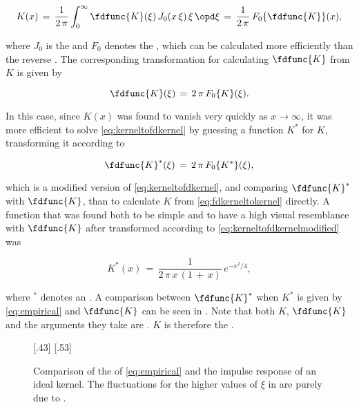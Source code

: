 \begin{equation} \label{eq:fdkerneltokernel}
K(x) \,=\, \frac{1}{2\,\pi}\int_0^\infty\fdfunc{K}(\xi)\,J_0(x\,\xi)\,\xi\,\opd\xi \,=\, \frac{1}{2\,\pi}\,F_0\{\fdfunc{K}\}(x),
\end{equation}

where $J_0$ is the  and $F_0$ denotes the , which can be calculated more efficiently than the reverse . The corresponding transformation for calculating $\fdfunc{K}$ from $K$ is given by

\begin{equation} \label{eq:kerneltofdkernel}
\fdfunc{K}(\xi) \,=\, 2\,\pi\,F_0\{K\}(\xi).
\end{equation}

In this case, since $K(x)$ was found to vanish very quickly as $x\rightarrow\infty$, it was more efficient to solve \eqref{eq:kerneltofdkernel} by guessing a function $K^*$ for $K$, transforming it according to

\begin{equation} \label{eq:kerneltofdkernelmodified}
\fdfunc{K}^*(\xi) \,=\, 2\,\pi\,F_0\{K^*\}(\xi),
\end{equation}

which is a modified version of \eqref{eq:kerneltofdkernel}, and comparing $\fdfunc{K}^*$ with $\fdfunc{K}$, than to calculate $K$ from \eqref{eq:fdkerneltokernel} directly. A function that was found both to be simple and to have a high visual resemblance with $\fdfunc{K}$ after transformed according to \eqref{eq:kerneltofdkernelmodified} was

\begin{equation} \label{eq:empirical}
K^*(x) \,=\, \frac{1}{2\,\pi\,x\,(1\,+\,x)}\,e^{-x^2/4},
\end{equation}

where $^*$ denotes an \estimate. A comparison between $\fdfunc{K}^*$ when $K^*$ is given by \eqref{eq:empirical} and $\fdfunc{K}$ can be seen in . Note that both $K$, $\fdfunc{K}$ and the arguments they take are . $K$ is therefore the .

\begin{figure}
    \centering
    \subcaptionbox{\label{fig:transformedkernelcomparison}}[.43\textwidth]{}
    \subcaptionbox{\label{fig:transformedkernelratio}}[.53\textwidth]{}
    \caption{Comparison of the  of \eqref{eq:empirical} and the impulse response of an ideal kernel. The fluctuations for the higher values of $\xi$ in  are purely due to .}
    \label{fig:transformedkernel}
\end{figure}

